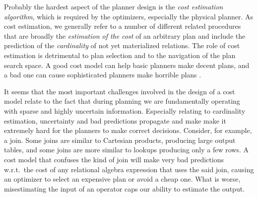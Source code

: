 
Probably the hardest aspect of the planner design is the \emph{cost
estimation algorithm}, which is required by the optimizers, especially
the physical planner.  As cost
estimation, we generally refer to a number of different related
procedures that are broadly the \emph{estimation of the cost} of an
arbitrary plan and include the prediction of the \emph{cardinality} of
not yet materialized relations. The role of cost estimation is
detrimental to plan selection and
to the navigation of the plan search space. A good cost model can help basic
planners make decent plans, and a bad one can cause sophisticated
planners make horrible plans \cite{leisHowGoodAre2015}.

It seems that the most important challenges involved in the design of
a cost model relate to the fact that during planning we are fundamentally operating
with sparse and highly uncertain information. Especially relating to
cardinality estimation, uncertainty and bad predictions propagate and
make make it extremely hard for the planners to make correct
decisions. Consider, for example, a join. Some joins are similar to
Cartesian products, producing large output tables, and some joins are
more similar to lookups producing only a few rows. A cost model that
confuses the kind of join will make very bad predictions w.r.t.\ the
cost of any relational algebra expression that uses the said join,
causing an optimizer to select an expensive plan or avoid a cheap
one. What is worse, misestimating the input of an operator caps our
ability to estimate the output. 

